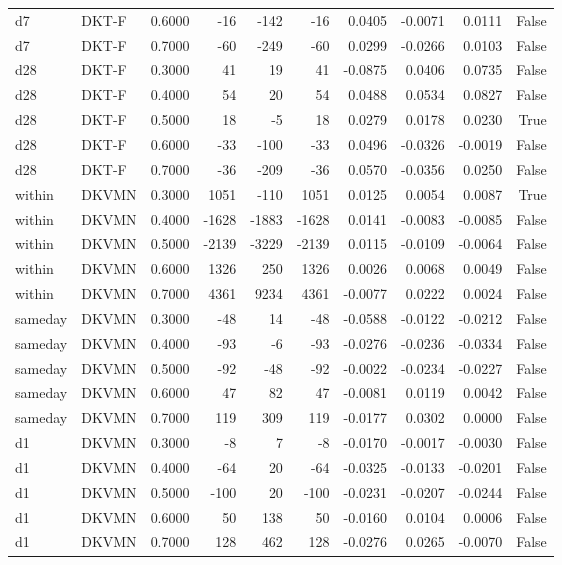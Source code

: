\begin{tabular}{llrrrrrrrr}
d7 & DKT-F & 0.6000 & -16 & -142 & -16 & 0.0405 & -0.0071 & 0.0111 & False \\
d7 & DKT-F & 0.7000 & -60 & -249 & -60 & 0.0299 & -0.0266 & 0.0103 & False \\
d28 & DKT-F & 0.3000 & 41 & 19 & 41 & -0.0875 & 0.0406 & 0.0735 & False \\
d28 & DKT-F & 0.4000 & 54 & 20 & 54 & 0.0488 & 0.0534 & 0.0827 & False \\
d28 & DKT-F & 0.5000 & 18 & -5 & 18 & 0.0279 & 0.0178 & 0.0230 & True \\
d28 & DKT-F & 0.6000 & -33 & -100 & -33 & 0.0496 & -0.0326 & -0.0019 & False \\
d28 & DKT-F & 0.7000 & -36 & -209 & -36 & 0.0570 & -0.0356 & 0.0250 & False \\
within & DKVMN & 0.3000 & 1051 & -110 & 1051 & 0.0125 & 0.0054 & 0.0087 & True \\
within & DKVMN & 0.4000 & -1628 & -1883 & -1628 & 0.0141 & -0.0083 & -0.0085 & False \\
within & DKVMN & 0.5000 & -2139 & -3229 & -2139 & 0.0115 & -0.0109 & -0.0064 & False \\
within & DKVMN & 0.6000 & 1326 & 250 & 1326 & 0.0026 & 0.0068 & 0.0049 & False \\
within & DKVMN & 0.7000 & 4361 & 9234 & 4361 & -0.0077 & 0.0222 & 0.0024 & False \\
sameday & DKVMN & 0.3000 & -48 & 14 & -48 & -0.0588 & -0.0122 & -0.0212 & False \\
sameday & DKVMN & 0.4000 & -93 & -6 & -93 & -0.0276 & -0.0236 & -0.0334 & False \\
sameday & DKVMN & 0.5000 & -92 & -48 & -92 & -0.0022 & -0.0234 & -0.0227 & False \\
sameday & DKVMN & 0.6000 & 47 & 82 & 47 & -0.0081 & 0.0119 & 0.0042 & False \\
sameday & DKVMN & 0.7000 & 119 & 309 & 119 & -0.0177 & 0.0302 & 0.0000 & False \\
d1 & DKVMN & 0.3000 & -8 & 7 & -8 & -0.0170 & -0.0017 & -0.0030 & False \\
d1 & DKVMN & 0.4000 & -64 & 20 & -64 & -0.0325 & -0.0133 & -0.0201 & False \\
d1 & DKVMN & 0.5000 & -100 & 20 & -100 & -0.0231 & -0.0207 & -0.0244 & False \\
d1 & DKVMN & 0.6000 & 50 & 138 & 50 & -0.0160 & 0.0104 & 0.0006 & False \\
d1 & DKVMN & 0.7000 & 128 & 462 & 128 & -0.0276 & 0.0265 & -0.0070 & False \\

\end{tabular}
